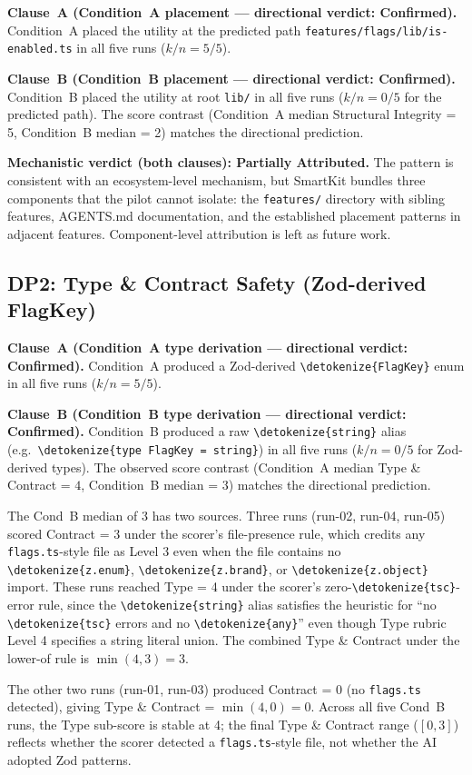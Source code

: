 \documentclass[12pt,a4paper]{report}
\newcommand{\code}[1]{\texttt{\nolinkurl{\detokenize{#1}}}}
\DeclareRobustCommand{\filename}[1]{\bgroup\urlstyle{tt}\nolinkurl{#1}\egroup}
\begin{document}
\textbf{Clause~A (Condition~A placement — directional verdict: Confirmed).} Condition~A placed the utility at the predicted path \filename{features/flags/lib/is-enabled.ts} in all five runs ($k/n = 5/5$).

\textbf{Clause~B (Condition~B placement — directional verdict: Confirmed).} Condition~B placed the utility at root \filename{lib/} in all five runs ($k/n = 0/5$ for the predicted path). The score contrast (Condition~A median Structural Integrity = 5, Condition~B median = 2) matches the directional prediction.

\textbf{Mechanistic verdict (both clauses): Partially Attributed.} The pattern is consistent with an ecosystem-level mechanism, but SmartKit bundles three components that the pilot cannot isolate: the \filename{features/} directory with sibling features, AGENTS.md documentation, and the established placement patterns in adjacent features. Component-level attribution is left as future work.

\subsection{DP2: Type \& Contract Safety (Zod-derived FlagKey)}
\label{sec:dp2-results}

\textbf{Clause~A (Condition~A type derivation — directional verdict: Confirmed).} Condition~A produced a Zod-derived \code{FlagKey} enum in all five runs ($k/n = 5/5$).

\textbf{Clause~B (Condition~B type derivation — directional verdict: Confirmed).} Condition~B produced a raw \code{string} alias (e.g.\ \code{type FlagKey = string}) in all five runs ($k/n = 0/5$ for Zod-derived types). The observed score contrast (Condition~A median Type \& Contract = $4$, Condition~B median = $3$) matches the directional prediction.

The Cond~B median of $3$ has two sources. Three runs (run-02, run-04, run-05) scored Contract = 3 under the scorer's file-presence rule, which credits any \filename{flags.ts}-style file as Level 3 even when the file contains no \code{z.enum}, \code{z.brand}, or \code{z.object} import. These runs reached Type = 4 under the scorer's zero-\code{tsc}-error rule, since the \code{string} alias satisfies the heuristic for ``no \code{tsc} errors and no \code{any}'' even though Type rubric Level 4 specifies a string literal union. The combined Type \& Contract under the lower-of rule is $\min(4, 3) = 3$.

The other two runs (run-01, run-03) produced Contract = 0 (no \filename{flags.ts} detected), giving Type \& Contract = $\min(4, 0) = 0$. Across all five Cond~B runs, the Type sub-score is stable at 4; the final Type \& Contract range ($[0, 3]$) reflects whether the scorer detected a \filename{flags.ts}-style file, not whether the AI adopted Zod patterns.
\end{document}

